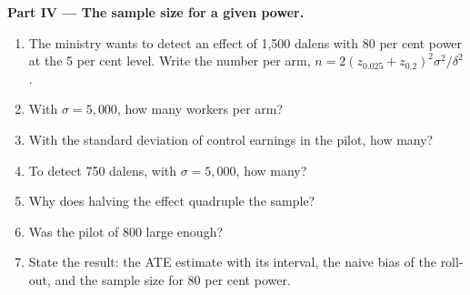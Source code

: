\begin{problem}
\medskip
\noindent\textbf{Part IV --- The sample size for a given power.}
\begin{enumerate}[resume]
  \item The ministry wants to detect an effect of 1,500 dalens with 80 per cent power at the 5 per cent level. Write the
  number per arm, $n = 2(z_{0.025} + z_{0.2})^2\sigma^2/\delta^2$.
  \item With $\sigma = 5{,}000$, how many workers per arm?
  \item With the standard deviation of control earnings in the pilot, how many?
  \item To detect 750 dalens, with $\sigma = 5{,}000$, how many?
  \item Why does halving the effect quadruple the sample?
  \item Was the pilot of 800 large enough?
  \item State the result: the ATE estimate with its interval, the naive bias of the roll-out, and the sample size for 80 per
  cent power.
\end{enumerate}
\end{problem}
